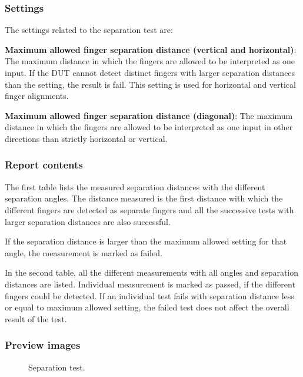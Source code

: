\subsubsection{Settings}

The settings related to the separation test are:

\textbf{Maximum allowed finger separation distance (vertical and horizontal)}: The maximum distance in which the fingers are allowed to be interpreted as one input. If the DUT cannot detect distinct fingers with larger separation distances than the setting, the result is fail. This setting is used for horizontal and vertical finger alignments.

\textbf{Maximum allowed finger separation distance (diagonal)}: The maximum distance in which the fingers are allowed to be interpreted as one input in other directions than strictly horizontal or vertical.

\subsubsection{Report contents}

The first table lists the measured separation distances with the different separation angles. The distance measured is the first distance with which the different fingers are detected as separate fingers and all the successive tests with larger separation distances are also successful.

If the separation distance is larger than the maximum allowed setting for that angle, the measurement is marked as failed.

In the second table, all the different measurements with all angles and separation distances are listed. Individual measurement is marked as passed, if the different fingers could be detected. If an individual test fails with separation distance less or equal to maximum allowed setting, the failed test does not affect the overall result of the test.

\subsubsection{Preview images}

\begin{figure}[!h]
	\caption{Separation test.}
\end{figure}

